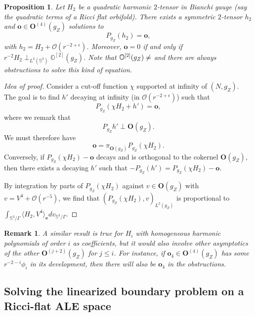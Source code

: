 \documentclass[12pt]{article}
\newtheorem{prop}[thm]{Proposition}
\newtheorem{rem}[thm]{Remark}
\begin{document}
   \begin{prop}\label{resolutino modulo obst linear}
        Let $H_2$ be a quadratic harmonic $2$-tensor in Bianchi gauge (say the quadratic terms of a Ricci flat orbifold). There exists a symmetric $2$-tensor $h_2$ and $\mathbf{o}\in \mathbf{O}^{(4)}({g_Z})$ solutions to
        $$ P_{g_Z}(h_2) = \mathbf{o}, $$
        with $h_2 = H_2 + \mathcal{O}(r^{-2+\epsilon})$. Moreover, $\mathbf{o} = 0$ if and only if $ r^{-2}H_2 \perp_{L^2(\mathbb{S}^3)}  \mathbb{O}^{[2]}({g_Z}) $. Note that $\mathbb{O}^{[2]}({g_Z})\neq \empty$ and there are \emph{always} obstructions to solve this kind of equation.
   \end{prop}
   \begin{proof}[Idea of proof]
        Consider a cut-off function $\chi$ supported at infinity of $(N,{g_Z})$. The goal is to find $h'$ decaying at infinity (in $\mathcal{O}(r^{-2+\epsilon})$) such that 
        $$ P_{g_Z}(\chi H_2 + h') = \mathbf{o}, $$
        where we remark that 
        $$ P_{{g_Z}}h'\perp \mathbf{O}({g_Z}). $$
        We must therefore have 
        $$\mathbf{o} = \pi_{\mathbf{O}({g_Z})}P_{g_Z}(\chi H_2).$$
        Conversely, if $P_{g_Z}(\chi H_2)-\mathbf{o}$ decays and is orthogonal to the cokernel $\mathbf{O}({g_Z})$, then there exists a decaying $h'$ such that $-P_{g_Z}(h') = P_{g_Z}(\chi H_2)-\mathbf{o}$.
        
        By integration by parts of $P_{g_Z}(\chi H_2)$ against $v\in\mathbf{O}({g_Z})$ with $v = V^4 + \mathcal{O}(r^{-5})$, we find that
        $\left(P_{g_Z}(\chi H_2),v\right)_{L^2({g_Z})}$ is proportional to $\int_{\mathbb{S}^3\slash\Gamma} \langle H_2,V^4 \rangle_{\mathbf{e}} dv_{\mathbb{S}^3\slash\Gamma}$.
   \end{proof}
   
   \begin{rem}
        A similar result is true for $H_i$ with homogeneous harmonic polynomials of order $i$ as coefficients, but it would also involve other asymptotics of the other $\mathbf{O}^{(j+2)}({g_Z})$ for $j\leqslant i$. For instance, if $\mathbf{o}_4 \in \mathbf{O}^{(4)}({g_Z})$ has some $r^{-2-i} \phi_i$ in its development, then there will also be $\mathbf{o}_4$ in the obstructions.
   \end{rem}
   
   \subsection{Solving the linearized boundary problem on a Ricci-flat ALE space}
   
\end{document}
